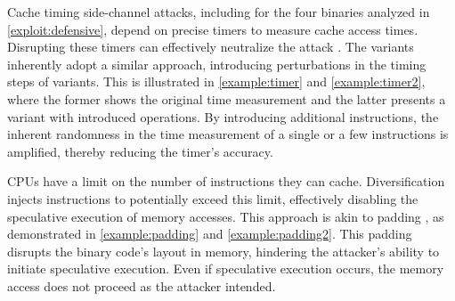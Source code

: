  Cache timing side-channel attacks, including for the four binaries analyzed in \autoref{exploit:defensive}, depend on precise timers to measure cache access times. 
Disrupting these timers can effectively neutralize the attack \cite{JStimers}. 
The \Wasm variants inherently adopt a similar approach, introducing perturbations in the timing steps of \Wasm variants. 
This is illustrated in \autoref{example:timer} and \autoref{example:timer2}, where the former shows the original time measurement and the latter presents a variant with introduced operations.
By introducing additional instructions, the inherent randomness in the time measurement of a single or a few instructions is amplified, thereby reducing the timer's accuracy. 




 CPUs have a limit on the number of instructions they can cache. 
Diversification injects instructions to potentially exceed this limit, effectively disabling the speculative execution of memory accesses. 
This approach is akin to padding \cite{padding}, as demonstrated in \autoref{example:padding} and \autoref{example:padding2}.
This padding disrupts the binary code's layout in memory, hindering the attacker's ability to initiate speculative execution. 
Even if speculative execution occurs, the memory access does not proceed as the attacker intended.





